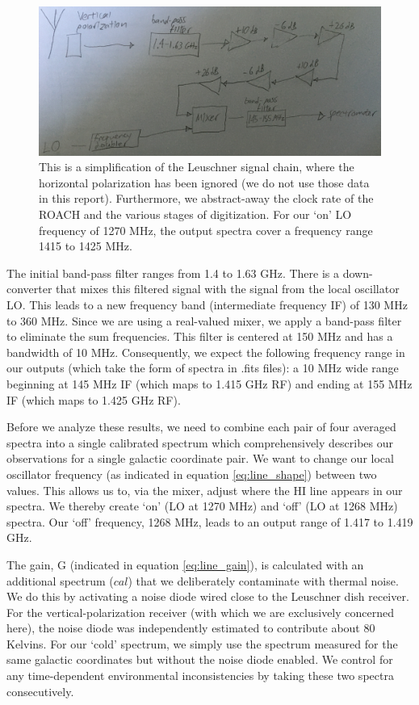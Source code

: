 \documentclass[12pt]{article}
\begin{document}
\begin{figure}
	\centering
	\includegraphics[width=.9\linewidth]{sig_chain}
	\caption{This is a simplification of the Leuschner signal chain, where the horizontal polarization has been ignored (we do not use those data in this report). Furthermore, we abstract-away the clock rate of the ROACH and the various stages of digitization. For our `on' LO frequency of 1270 MHz, the output spectra cover a frequency range 1415 to 1425 MHz.}
	\label{fig:sig_chain}
\end{figure}

The initial band-pass filter ranges from 1.4 to 1.63 GHz. There is a down-converter that mixes this filtered signal with the signal from the local oscillator LO. This leads to a new frequency band (intermediate frequency IF) of 130 MHz to 360 MHz. Since we are using a real-valued mixer, we apply a band-pass filter to eliminate the sum frequencies. This filter is centered at 150 MHz and has a bandwidth of 10 MHz. Consequently, we expect the following frequency range in our outputs (which take the form of spectra in .fits files): a 10 MHz wide range beginning at 145 MHz IF (which maps to 1.415 GHz RF) and ending at 155 MHz IF (which maps to 1.425 GHz RF).

Before we analyze these results, we need to combine each pair of four averaged spectra into a single calibrated spectrum which comprehensively describes our observations for a single galactic coordinate pair. We want to change our local oscillator frequency (as indicated in equation \ref{eq:line_shape}) between two values. This allows us to, via the mixer, adjust where the HI line appears in our spectra. We thereby create `on' (LO at 1270 MHz) and `off' (LO at 1268 MHz) spectra. Our `off' frequency, 1268 MHz, leads to an output range of 1.417 to 1.419 GHz. 

The gain, G (indicated in equation \ref{eq:line_gain}), is calculated with an additional spectrum ($cal$) that we deliberately contaminate with thermal noise. We do this by activating a noise diode wired close to the Leuschner dish receiver. For the vertical-polarization receiver (with which we are exclusively concerned here), the noise diode was independently estimated to contribute about 80 Kelvins. For our `cold' spectrum, we simply use the spectrum measured for the same galactic coordinates but without the noise diode enabled. We control for any time-dependent environmental inconsistencies by taking these two spectra consecutively.
\end{document}
